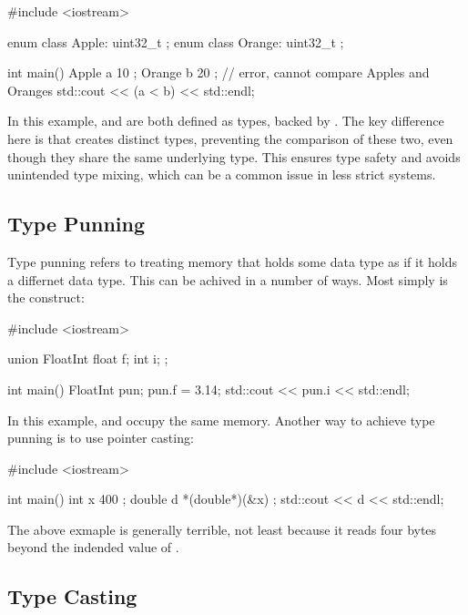 \documentclass[12pt]{article}
\begin{document}
\begin{cxx}{}
#include <iostream>

enum class Apple: uint32_t {};
enum class Orange: uint32_t {};

int main()
{
	Apple a { 10 };
	Orange b { 20 };
	// error, cannot compare Apples and Oranges
	std::cout << (a < b) << std::endl;
}
\end{cxx}

\noindent In this example,  and  are both defined as  types, backed by .
The key difference here is that  creates distinct types, preventing the comparison of these two, even though they share the same underlying type.
This ensures type safety and avoids unintended type mixing, which can be a common issue in less strict systems.

\subsection{Type Punning}

\noindent
Type punning refers to treating memory that holds some data type as if it holds a differnet data type.
This can be achived in a number of ways.
Most simply is the  construct:

\begin{cxx}{}
#include <iostream>

union FloatInt
{
    float f;
    int i;
};

int main()
{
    FloatInt pun;
    pun.f = 3.14;
    std::cout << pun.i << std::endl;
}
\end{cxx}

\noindent
In this example,  and  occupy the same memory. Another way to achieve type punning is to use pointer casting:

\begin{cxx}{}
#include <iostream>

int main()
{
	int x { 400 };
	double d { *(double*)(&x) };
	std::cout << d << std::endl;
}
\end{cxx}

\noindent
The above exmaple is generally terrible, not least because it reads four bytes beyond the indended value of .

\subsection{Type Casting}
\end{document}
